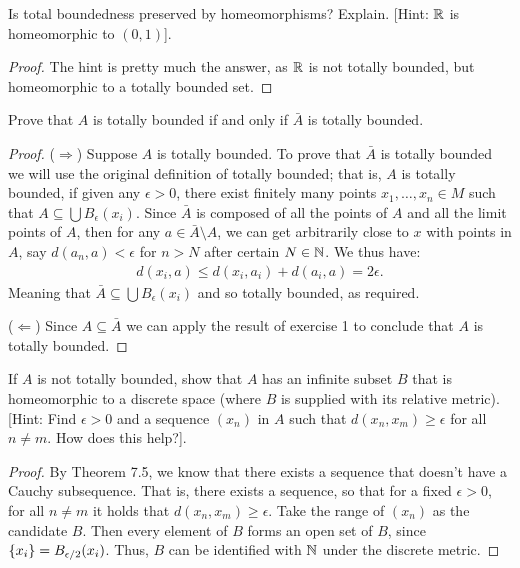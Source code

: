 \begin{exercise}{3}
Is total boundedness preserved by homeomorphisms?
Explain.
[Hint: $\mathbb{R}$ is homeomorphic to $(0,1)$].
\end{exercise}
\begin{proof}
The hint is pretty much the answer, as $\mathbb{R}$ is not totally bounded, but homeomorphic to a totally bounded set.
\end{proof} 

\begin{exercise}{5}
Prove that $A$ is totally bounded if and only if $\bar{A}$ is totally bounded.
\end{exercise}
\begin{proof}
($\Rightarrow$)
Suppose $A$ is totally bounded.
To prove that $\bar{A}$ is totally bounded we will use the original definition of totally bounded;
that is, $A$ is totally bounded, if given any $\epsilon>0$, there exist finitely many points $x_1,\dots,x_n\in M$ such that $A\subseteq \bigcup B_\epsilon(x_i)$.
Since $\bar{A}$ is composed of all the points of $A$ and all the limit points of $A$, then for any $a\in\bar{A}\setminus A$, we can get arbitrarily close to $x$ with points in $A$, say $d(a_n,a)<\epsilon$ for $n>N$ after certain $N\in\mathbb{N}$.
We thus have:
\begin{align*}
    d(x_i, a) \leq d(x_i, a_i) + d(a_i, a) = 2\epsilon.
\end{align*}
Meaning that $\bar{A}\subseteq \bigcup B_\epsilon(x_i)$ and so totally bounded, as required.

($\Leftarrow$)
Since $A\subseteq \bar{A}$ we can apply the result of exercise 1 to conclude that $A$ is totally bounded.
\end{proof} 

\begin{exercise}{8}
If $A$ is not totally bounded, show that $A$ has an infinite subset $B$ that is homeomorphic to a discrete space (where $B$ is supplied with its relative metric).
[Hint: Find $\epsilon>0$ and a sequence $(x_n)$ in $A$ such that $d(x_n,x_m)\geq\epsilon$ for all $n\neq m$.
How does this help?].
\end{exercise}
\begin{proof}
By Theorem 7.5, we know that there exists a sequence that doesn't have a Cauchy subsequence.
That is, there exists a sequence, so that for a fixed $\epsilon>0$, for all $n\neq m$ it holds that $d(x_n,x_m) \geq \epsilon$. 
Take the range of $(x_n)$ as the candidate $B$.
Then every element of $B$ forms an open set of $B$, since $\{x_i\} = B_{\epsilon/2}(x_i)$.
Thus, $B$ can be identified with $\mathbb{N}$ under the discrete metric.
\end{proof} 

